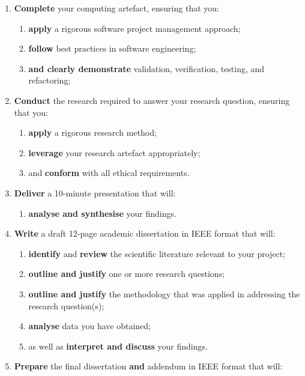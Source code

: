 \begin{enumerate}[label=(\Alph*)]
	\item \textbf{Complete} your computing artefact, ensuring that you:
		\begin{enumerate}[label=(\roman*)]
			\item \textbf{apply} a rigorous software project management approach;
			\item \textbf{follow} best practices in software engineering;
			\item \textbf{and clearly demonstrate} validation, verification, testing, and refactoring;
		\end{enumerate}
	\item \textbf{Conduct} the research required to answer your research question,
		ensuring that you:
		\begin{enumerate}[label=(\roman*)]
			\item \textbf{apply} a rigorous research method;
			\item \textbf{leverage} your research artefact appropriately;
			\item and \textbf{conform} with all ethical requirements.
		\end{enumerate}
	\item \textbf{Deliver} a 10-minute presentation that will:
		\begin{enumerate}[label=(\roman*)]
			\item \textbf{analyse and synthesise} your findings.
		\end{enumerate}
	\item \textbf{Write} a draft 12-page academic dissertation in IEEE format
		that will:
		\begin{enumerate}[label=(\roman*)]
			\item \textbf{identify} and \textbf{review} the scientific literature relevant to your project;
			\item \textbf{outline and justify} one or more research questions;
			\item \textbf{outline and justify} the methodology that was applied in addressing the research question(s);
			\item \textbf{analyse} data you have obtained;
			\item as well as \textbf{interpret and discuss} your findings.
		\end{enumerate}
	\item \textbf{Prepare} the final dissertation \textbf{and} addendum in IEEE format that will:
		\begin{enumerate}[label=(\roman*)]

\end{enumerate}
\end{enumerate}

